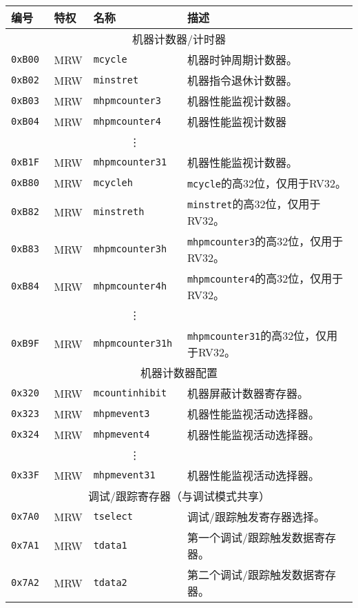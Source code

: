 \begin{table}[htb!]
\begin{center}
\begin{tabular}{|l|l|l|l|}
\hline
编号    & 特权      & 名称          & 描述 \\
\hline
\multicolumn{4}{|c|}{机器计数器/计时器} \\
\hline
\tt 0xB00 & MRW  &\tt mcycle         & 机器时钟周期计数器。 \\
\tt 0xB02 & MRW  &\tt minstret       & 机器指令退休计数器。 \\
\tt 0xB03 & MRW  &\tt mhpmcounter3   & 机器性能监视计数器。 \\
\tt 0xB04 & MRW  &\tt mhpmcounter4   & 机器性能监视计数器 \\
& & \multicolumn{1}{c|}{\vdots} & \ \\
\tt 0xB1F & MRW  &\tt mhpmcounter31  & 机器性能监视计数器。 \\
\tt 0xB80 & MRW  &\tt mcycleh        & {\tt mcycle}的高32位，仅用于RV32。\\
\tt 0xB82 & MRW  &\tt minstreth      & {\tt minstret}的高32位，仅用于RV32。 \\
\tt 0xB83 & MRW  &\tt mhpmcounter3h  & {\tt mhpmcounter3}的高32位，仅用于RV32。 \\
\tt 0xB84 & MRW  &\tt mhpmcounter4h  & {\tt mhpmcounter4}的高32位，仅用于RV32。 \\
& & \multicolumn{1}{c|}{\vdots} & \ \\
\tt 0xB9F & MRW  &\tt mhpmcounter31h & {\tt mhpmcounter31}的高32位，仅用于RV32。 \\
\hline
\multicolumn{4}{|c|}{机器计数器配置} \\
\hline
\tt 0x320 & MRW  &\tt mcountinhibit  & 机器屏蔽计数器寄存器。 \\
\tt 0x323 & MRW  &\tt mhpmevent3     & 机器性能监视活动选择器。 \\
\tt 0x324 & MRW  &\tt mhpmevent4     & 机器性能监视活动选择器。 \\
& & \multicolumn{1}{c|}{\vdots} & \ \\
\tt 0x33F & MRW  &\tt mhpmevent31    & 机器性能监视活动选择器。 \\
\hline
\multicolumn{4}{|c|}{调试/跟踪寄存器（与调试模式共享）} \\
\hline
\tt 0x7A0 & MRW &\tt tselect & 调试/跟踪触发寄存器选择。\\
\tt 0x7A1 & MRW &\tt tdata1 & 第一个调试/跟踪触发数据寄存器。 \\
\tt 0x7A2 & MRW &\tt tdata2 & 第二个调试/跟踪触发数据寄存器。 \\

\end{tabular}
\end{center}
\end{table}
